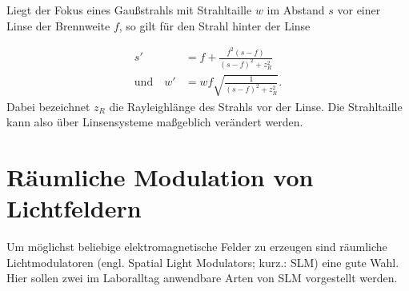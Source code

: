 \documentclass[
class=book,
accentcolor=1b,
custommargins=geometry,
fontsize=11pt,
thesis={type=Versuchsanleitung},
ruledheaders=all,
headline=false,
instbox=false,
marginpar=false,
title=small,
ignore-missing-data=true,
twoside=false,
pdfa=false %
]{apqpub}
\begin{document}
Liegt der Fokus eines Gaußstrahls mit Strahltaille $w$ im Abstand $s$ vor einer Linse der Brennweite $f$, so gilt für den Strahl hinter der Linse

\begin{subequations}
\begin{align*}
s' &= f + \frac{f^2 \left( s - f \right)}{\left( s - f \right)^2 + z_R^2}  \\
\label{eq:gausswaist}
\text{und} \quad w' &= w f \sqrt{\frac{1}{\left(s-f\right)^2+z_R^2}}.
\end{align*}
\end{subequations}
Dabei bezeichnet $z_R$ die Rayleighlänge des Strahls vor der Linse.
Die Strahltaille kann also über Linsensysteme maßgeblich verändert werden.

	\section{Räumliche Modulation von Lichtfeldern}
Um möglichst beliebige elektromagnetische Felder zu erzeugen sind räumliche Lichtmodulatoren (engl. Spatial Light Modulators; kurz.: SLM) eine gute Wahl.
Hier sollen zwei im Laboralltag anwendbare Arten von SLM vorgestellt werden. 
\end{document}
